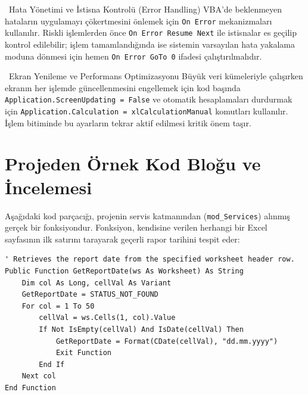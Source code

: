 \vspace{0.1cm}

\begin{warningbox}{\faExclamationTriangle\ Hata Yönetimi ve İstisna Kontrolü (Error Handling)}
VBA'de beklenmeyen hataların uygulamayı çökertmesini önlemek için \texttt{On Error} mekanizmaları kullanılır. Riskli işlemlerden önce \texttt{On Error Resume Next} ile istisnalar es geçilip kontrol edilebilir; işlem tamamlandığında ise sistemin varsayılan hata yakalama moduna dönmesi için hemen \texttt{On Error GoTo 0} ifadesi çalıştırılmalıdır.
\end{warningbox}

\vspace{0.1cm}

\begin{warningbox}{\faTachometer*\ Ekran Yenileme ve Performans Optimizasyonu}
Büyük veri kümeleriyle çalışırken ekranın her işlemde güncellenmesini engellemek için kod başında \texttt{Application.ScreenUpdating = False} ve otomatik hesaplamaları durdurmak için \texttt{Application.Calculation = xlCalculationManual} komutları kullanılır. İşlem bitiminde bu ayarların tekrar aktif edilmesi kritik önem taşır.
\end{warningbox}



\newpage


\section{Projeden Örnek Kod Bloğu ve İncelemesi}

Aşağıdaki kod parçacığı, projenin servis katmanından (\texttt{mod\_Services}) alınmış gerçek bir fonksiyondur. Fonksiyon, kendisine verilen herhangi bir Excel sayfasının ilk satırını tarayarak geçerli rapor tarihini tespit eder:

\begin{lstlisting}[caption={Rapor Tarihi Tespit Servis Fonksiyonu (mod\_Services)}]
' Retrieves the report date from the specified worksheet header row.
Public Function GetReportDate(ws As Worksheet) As String
    Dim col As Long, cellVal As Variant
    GetReportDate = STATUS_NOT_FOUND
    For col = 1 To 50
        cellVal = ws.Cells(1, col).Value
        If Not IsEmpty(cellVal) And IsDate(cellVal) Then
            GetReportDate = Format(CDate(cellVal), "dd.mm.yyyy")
            Exit Function
        End If
    Next col
End Function
\end{lstlisting}

